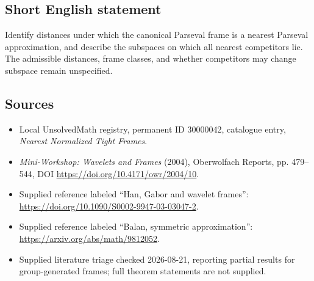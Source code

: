 \documentclass[11pt]{article}
\begin{document}
\subsection{Short English statement}
Identify distances under which the canonical Parseval frame is a nearest Parseval approximation, and describe the subspaces on which all nearest competitors lie. The admissible distances, frame classes, and whether competitors may change subspace remain unspecified.
\subsection{Sources}
\begin{itemize}
\item Local UnsolvedMath registry, permanent ID 30000042, catalogue entry, \emph{Nearest Normalized Tight Frames}.
\item \emph{Mini-Workshop: Wavelets and Frames} (2004), Oberwolfach Reports, pp. 479--544, DOI \url{https://doi.org/10.4171/owr/2004/10}.
\item Supplied reference labeled ``Han, Gabor and wavelet frames'': \url{https://doi.org/10.1090/S0002-9947-03-03047-2}.
\item Supplied reference labeled ``Balan, symmetric approximation'': \url{https://arxiv.org/abs/math/9812052}.
\item Supplied literature triage checked 2026-08-21, reporting partial results for group-generated frames; full theorem statements are not supplied.
\end{itemize}
\end{document}
